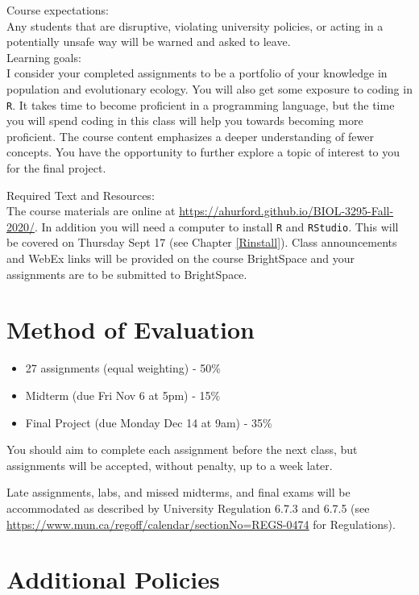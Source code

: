 \documentclass[]{book}
\providecommand{\tightlist}{%
  \setlength{\itemsep}{0pt}\setlength{\parskip}{0pt}}
\begin{document}
Course expectations:\\
Any students that are disruptive, violating university policies, or
acting in a potentially unsafe way will be warned and asked to
leave.\\[2\baselineskip]Learning goals:\\
I consider your completed assignments to be a portfolio of your
knowledge in population and evolutionary ecology. You will also get some
exposure to coding in \texttt{R}. It takes time to become proficient in
a programming language, but the time you will spend coding in this class
will help you towards becoming more proficient. The course content
emphasizes a deeper understanding of fewer concepts. You have the
opportunity to further explore a topic of interest to you for the final
project.

Required Text and Resources:\\
The course materials are online at
\url{https://ahurford.github.io/BIOL-3295-Fall-2020/}. In addition you
will need a computer to install \texttt{R} and \texttt{RStudio}. This
will be covered on Thursday Sept 17 (see Chapter \ref{Rinstall}). Class
announcements and WebEx links will be provided on the course BrightSpace
and your assignments are to be submitted to BrightSpace.

\section{Method of Evaluation}\label{method-of-evaluation}

\begin{itemize}
\tightlist
\item
  27 assignments (equal weighting) - 50\%
\item
  Midterm (due Fri Nov 6 at 5pm) - 15\%
\item
  Final Project (due Monday Dec 14 at 9am) - 35\%
\end{itemize}

You should aim to complete each assignment before the next class, but
assignments will be accepted, without penalty, up to a week later.

Late assignments, labs, and missed midterms, and final exams will be
accommodated as described by University Regulation 6.7.3 and 6.7.5 (see
\url{https://www.mun.ca/regoff/calendar/sectionNo=REGS-0474} for
Regulations).

\section{Additional Policies}\label{additional-policies}
\end{document}
